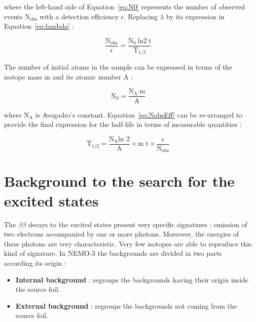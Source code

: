 \documentclass[main.tex]{subfiles}
\begin{document}
\bigskip


\NI where the left-hand side of Equation~\ref{eq:N0} represents the number of observed events N$_{\text{obs}}$ with a detection efficiency $\epsilon$. Replacing $\lambda$ by its expression in Equation~\ref{eq:lambda} : 

\begin{equation}\label{eq:NobsEff}
\frac{\text{N}_{\text{obs}}}{\epsilon} = \frac{\text{N}_\text{0}~\text{ln2}~\text{t}}{\text{T}_{\text{1/2}}}
\end{equation}


\bigskip


\NI The number of initial atoms in the sample can be expressed in terms of the isotope mass m and its atomic number A : 


\begin{equation}
\text{N}_\text{0} = \frac{\text{N}_\text{A}~\text{m}}{\text{A}}
\end{equation}


\bigskip


\NI where $\text{N}_\text{A}$ is Avogadro's constant. Equation~\ref{eq:NobsEff} can be re-arranged to provide the final expression for the half-life in terms of measurable quantities : 

\begin{equation}
\text{T}_{\text{1/2}} = \frac{\text{N}_\text{A} \text{ln 2}}{\text{A}} \times \text{m t} \times \frac{\epsilon}{\text{N}_{\text{obs}}}
\end{equation}



\section{Background to the search for the excited states}\label{sec:BKGexcitedStates}


\NI The $\beta \beta$ decays to the excited states present very specific signatures : emission of two electrons accompanied by one or more photons. Moreover, the energies of these photons are very characteristic. Very few isotopes are able to reproduce this kind of signature. In NEMO-3 the backgrounds are divided in two parts according its origin : 


\begin{itemize}
\item \textbf{Internal background} : regroups the backgrounds having their origin inside the source foil.
\item \textbf{External background} : regroups the backgrounds not coming from the source foil.
\end{itemize}
\end{document}
